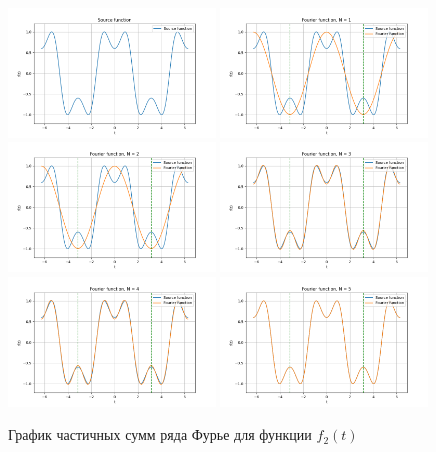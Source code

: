 \begin{figure}[ht!]
    \centering
    \includegraphics[width=0.49\textwidth]{media/plots/func_2.png}
    \includegraphics[width=0.49\textwidth]{media/plots/func_2_N_1.png}
    \includegraphics[width=0.49\textwidth]{media/plots/func_2_N_2.png}
    \includegraphics[width=0.49\textwidth]{media/plots/func_2_N_3.png}
    \includegraphics[width=0.49\textwidth]{media/plots/func_2_N_4.png}
    \includegraphics[width=0.49\textwidth]{media/plots/func_2_N_5.png}
    \caption{График частичных сумм ряда Фурье для функции $f_2(t)$}
    \label{fig:func_2_plot}
\end{figure}

